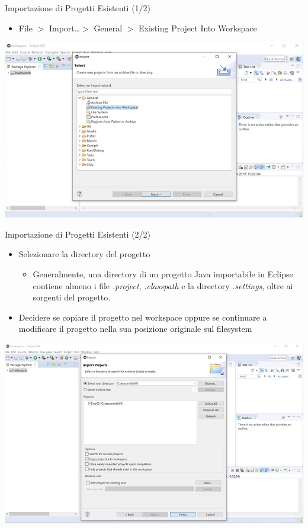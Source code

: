 \documentclass[xcolor=dvipsnames,presentation]{beamer}
\begin{document}
\begin{frame}{Importazione di Progetti Esistenti (1/2)}
\begin{itemize}
\item File $>$ Import\dots $>$ General $>$ Existing Project Into Workspace
\end{itemize}
\begin{center}
\includegraphics[width=\textwidth]{img/eclipse-screenshots/eclipse-ide-06a.jpg}
\end{center}
\end{frame}

\begin{frame}{Importazione di Progetti Esistenti (2/2)}
\begin{itemize}
\item Selezionare la directory del progetto
\begin{itemize}
\item Generalmente, una directory di un progetto Java importabile in Eclipse contiene almeno i file \emph{.project}, \emph{.classpath} e la directory \emph{.settings}, oltre ai sorgenti del progetto.
\end{itemize}
\item Decidere se copiare il progetto nel workspace oppure se continuare a modificare il progetto nella sua posizione originale sul filesystem
\end{itemize}
\begin{center}
\includegraphics[width=\textwidth]{img/eclipse-screenshots/eclipse-ide-06b.jpg}
\end{center}
\end{frame}
\end{document}
